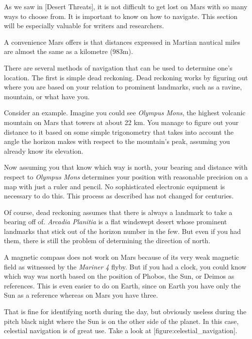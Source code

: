 

As we saw in [Desert Threats], it is not difficult to get lost on Mars with so many ways to choose from. It is important to know on how to navigate. This section will be especially valuable for writers and researchers.

A convenience Mars offers is that distances expressed in Martian nautical miles are almost the same as a kilometre (983m).

There are several methods of navigation that can be used to determine one's location. The first is simple dead reckoning. Dead reckoning works by figuring out where you are based on your relation to prominent landmarks, such as a ravine, mountain, or what have you. 

Consider an example. Imagine you could see {\it Olympus Mons}, the highest volcanic mountain on Mars that towers at about 22 km. You manage to figure out your distance to it based on some simple trigonometry that takes into account the angle the horizon makes with respect to the mountain's peak, assuming you already know its elevation. 

Now assuming you that know which way is north, your bearing and distance with respect to {\it Olympus Mons} determines your position with reasonable precision on a map with just a ruler and pencil. No sophisticated electronic equipment is necessary to do this. This process as described has not changed for centuries.

Of course, dead reckoning assumes that there is always a landmark to take a bearing off of. {\it Arcadia Planitia} is a flat windswept desert whose prominent landmarks that stick out of the horizon number in the few. But even if you had them, there is still the problem of determining the direction of north. 

A magnetic compass does not work on Mars because of its very weak magnetic field as witnessed by the {\it Mariner 4} flyby. But if you had a clock, you could know which way was north based on the position of Phobos, the Sun, or Deimos as references. This is even easier to do on Earth, since on Earth you have only the Sun as a reference whereas on Mars you have three.

That is fine for identifying north during the day, but obviously useless during the pitch black night where the Sun is on the other side of the planet. In this case, celestial navigation is of great use. Take a look at [figure:celestial_navigation].

